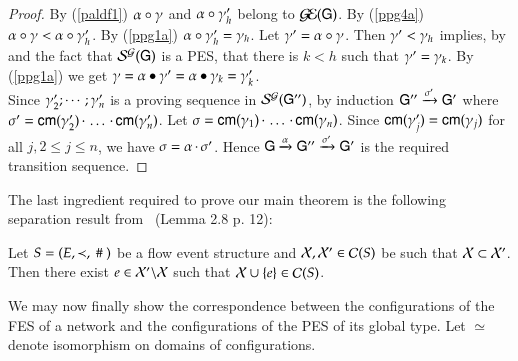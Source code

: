 \begin{proof}
By  (\ref{paldf1})  ${\alpha}\circ{\ensuremath{\gamma}}$ and ${\alpha}\circ{\ensuremath{\gamma}'_h}$  belong to $\mathcal{G\!E}({\sf G})$. By
(\ref{ppg4a})
${\alpha}\circ{\ensuremath{\gamma}}<{\alpha}\circ{\ensuremath{\gamma}'_h}$. 
By (\ref{ppg1a})
${\alpha}\circ{\ensuremath{\gamma}'_h}=\gamma_h$.
Let $\gamma' = {\alpha}\circ{\ensuremath{\gamma}}$. 
Then
$\gamma' < \gamma_h$ implies, by  
and the fact that $\mathcal{S}^{\mathcal{G}}({\sf G})$ is a PES, that there is $k<h$ 
such that $\gamma'
=\gamma_k$.  By (\ref{ppg1a})
we get $\gamma={\alpha}\bullet{\ensuremath{\gamma}'} = {\alpha}\bullet{\ensuremath{\gamma}_k}
= \gamma'_k$.\\
Since $\gamma'_2 ;\cdots ;\gamma'_n$ is a proving
sequence in $\mathcal{S}^{\mathcal{G}}({\sf G}'')$, by induction
${\sf G}''\xrightarrow{\sigma'}{\sf G}'$  where $\sigma' = 
{\sf cm}(\gamma'_2)\,{\cdot}\,\ldots\,{\cdot}\,{\sf cm}(\gamma'_n)$.  Let
$\sigma={\sf cm}(\gamma_1)\,{\cdot}\,\ldots\,{\cdot}\,{\sf cm}(\gamma_n)$. Since
${\sf cm}(\gamma'_j) = {\sf cm}(\gamma_j)$ for all $j, 2\leq j\leq n$, we
    have $\sigma = \alpha\,{\cdot}\,\sigma'$. Hence
${\sf G}\xrightarrow{\alpha}{\sf G}''\xrightarrow{\sigma'}{\sf G}'$
is the required transition sequence. 

\end{proof}


 The last ingredient required  to prove our main theorem is
the following separation result from~\cite{BC91} (Lemma 2.8 p. 12):

%
\begin{lemma}
%
Let $S=(E,\prec, ~\#~)$ be a flow event structure and $\mathcal{X}, \mathcal{X}' \in \mathcal{C}(S)$
be such that $\mathcal{X} \subset \mathcal{X}'$.
Then there exist $e \in \mathcal{X}'\backslash \mathcal{X}$ such that $\mathcal{X} \cup \{e\} \in \mathcal{C}(S)$.
\end{lemma}

We may now  finally  show the
correspondence between the configurations of the  FES of a network
and the configurations of the PES  of its global type.
Let $\simeq$ denote isomorphism on domains of configurations.

